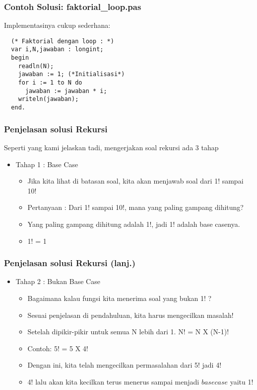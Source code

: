 \begin{frame}[fragile]
\frametitle{Contoh Solusi: faktorial\_loop.pas}
Implementasinya cukup sederhana:
\begin{lstlisting}
  (* Faktorial dengan loop : *)
  var i,N,jawaban : longint;
  begin
    readln(N);
    jawaban := 1; (*Initialisasi*)
    for i := 1 to N do
      jawaban := jawaban * i;
    writeln(jawaban);
  end.
\end{lstlisting}
\end{frame}

\begin{frame}
\frametitle{Penjelasan solusi Rekursi}
Seperti yang kami jelaskan tadi, mengerjakan soal rekursi ada 3 tahap
\begin{itemize}
  \item Tahap 1 : Base Case
    \begin {itemize}
      \item Jika kita lihat di batasan soal, kita akan menjawab soal dari 1! sampai 10!
      \item Pertanyaan : Dari 1! sampai 10!, mana yang paling gampang dihitung?
      \item Yang paling gampang dihitung adalah 1!, jadi 1! adalah base casenya.
      \item 1! = 1
    \end {itemize}
  \end{itemize}
\end{frame}

\begin{frame}
\frametitle{Penjelasan solusi Rekursi (lanj.) }
\begin{itemize}
  \item Tahap 2 : Bukan Base Case
    \begin {itemize}
      \item Bagaimana kalau fungsi kita menerima soal yang bukan 1! ?
      \item Sesuai penjelasan di pendahuluan, kita harus mengecilkan masalah!
      \item Setelah dipikir-pikir untuk semua N lebih dari 1. N! = N X (N-1)!
      \item Contoh: 5! = 5 X 4!
      \item Dengan ini, kita telah mengecilkan permasalahan dari 5! jadi 4!
      \item 4! lalu akan kita kecilkan terus menerus sampai menjadi $base case$ yaitu 1!
    \end {itemize}
  \end{itemize}
\end{frame}

